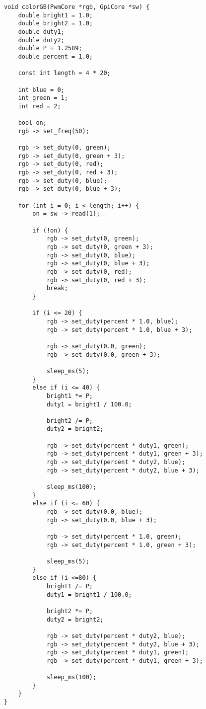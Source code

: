\documentclass[11pt]{article}
\begin{document}
\begin{lstlisting}[style=CStyle, caption = Color changing Function]
void colorGB(PwmCore *rgb, GpiCore *sw) {
	double bright1 = 1.0;
	double bright2 = 1.0;
	double duty1;
	double duty2;
	double P = 1.2589;
	double percent = 1.0;
	
	const int length = 4 * 20;
	
	int blue = 0;
	int green = 1;
	int red = 2;
	
	bool on;
	rgb -> set_freq(50);
	
	rgb -> set_duty(0, green);
	rgb -> set_duty(0, green + 3);
	rgb -> set_duty(0, red);
	rgb -> set_duty(0, red + 3);
	rgb -> set_duty(0, blue);
	rgb -> set_duty(0, blue + 3);
	
	for (int i = 0; i < length; i++) {
		on = sw -> read(1);
		
		if (!on) {
			rgb -> set_duty(0, green);
			rgb -> set_duty(0, green + 3);
			rgb -> set_duty(0, blue);
			rgb -> set_duty(0, blue + 3);
			rgb -> set_duty(0, red);
			rgb -> set_duty(0, red + 3);
			break;
		}
		
		if (i <= 20) {
			rgb -> set_duty(percent * 1.0, blue);
			rgb -> set_duty(percent * 1.0, blue + 3);
			
			rgb -> set_duty(0.0, green);
			rgb -> set_duty(0.0, green + 3);
			
			sleep_ms(5);
		}
		else if (i <= 40) {
			bright1 *= P;
			duty1 = bright1 / 100.0;
			
			bright2 /= P;
			duty2 = bright2;
			
			rgb -> set_duty(percent * duty1, green);
			rgb -> set_duty(percent * duty1, green + 3);
			rgb -> set_duty(percent * duty2, blue);
			rgb -> set_duty(percent * duty2, blue + 3);
			
			sleep_ms(100);
		}
		else if (i <= 60) {
			rgb -> set_duty(0.0, blue);
			rgb -> set_duty(0.0, blue + 3);
			
			rgb -> set_duty(percent * 1.0, green);
			rgb -> set_duty(percent * 1.0, green + 3);
		
			sleep_ms(5);
		}
		else if (i <=80) {
			bright1 /= P;
			duty1 = bright1 / 100.0;
			
			bright2 *= P;
			duty2 = bright2;
			
			rgb -> set_duty(percent * duty2, blue);
			rgb -> set_duty(percent * duty2, blue + 3);
			rgb -> set_duty(percent * duty1, green);
			rgb -> set_duty(percent * duty1, green + 3);
			
			sleep_ms(100);
		}
	}
}
\end{lstlisting}
\end{document}
